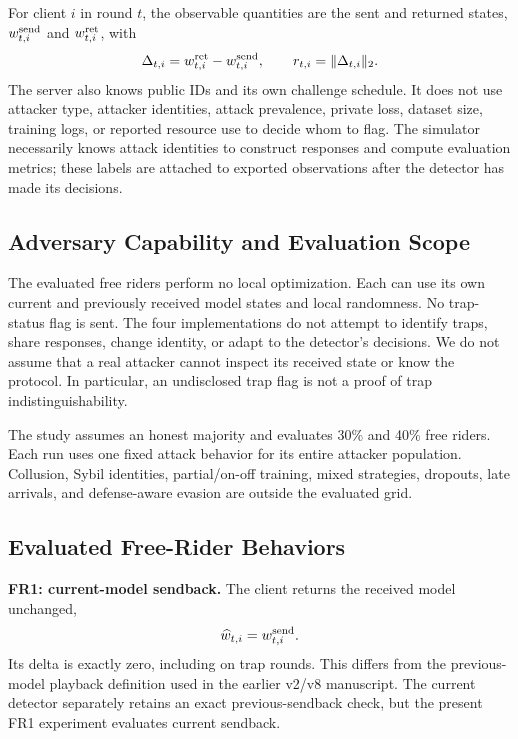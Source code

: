 \documentclass[conference]{IEEEtran}
\begin{document}
For client $i$ in round $t$, the observable quantities are the sent and returned
states, $w^{\rm send}_{t,i}$ and $w^{\rm ret}_{t,i}$, with
\begin{equation}
 \Delta_{t,i}=w^{\rm ret}_{t,i}-w^{\rm send}_{t,i},\qquad
 r_{t,i}=\|\Delta_{t,i}\|_2.
\end{equation}
The server also knows public IDs and its own challenge schedule. It does not
use attacker type, attacker identities, attack prevalence, private loss,
dataset size, training logs, or reported resource use to decide whom to flag.
The simulator necessarily knows attack identities to construct responses and
compute evaluation metrics; these labels are attached to exported observations
after the detector has made its decisions.

\subsection{Adversary Capability and Evaluation Scope}
The evaluated free riders perform no local optimization. Each can use its own
current and previously received model states and local randomness. No trap-status
flag is sent. The four implementations do not attempt to identify traps, share
responses, change identity, or adapt to the detector's decisions. We do not assume
that a real attacker cannot inspect its received state or know the protocol.
In particular, an undisclosed trap flag is not a proof of trap indistinguishability.

The study assumes an honest majority and evaluates 30\% and 40\% free riders.
Each run uses one fixed attack behavior for its entire attacker population.
Collusion, Sybil identities, partial/on-off training, mixed strategies, dropouts,
late arrivals, and defense-aware evasion are outside the evaluated grid.

\subsection{Evaluated Free-Rider Behaviors}
\noindent\textbf{FR1: current-model sendback.}
The client returns the received model unchanged,
\begin{equation}
 \widehat w_{t,i}=w^{\rm send}_{t,i}.
\end{equation}
Its delta is exactly zero, including on trap rounds. This differs from the
previous-model playback definition used in the earlier v2/v8 manuscript. The
current detector separately retains an exact previous-sendback check, but the
present FR1 experiment evaluates current sendback.
\end{document}
